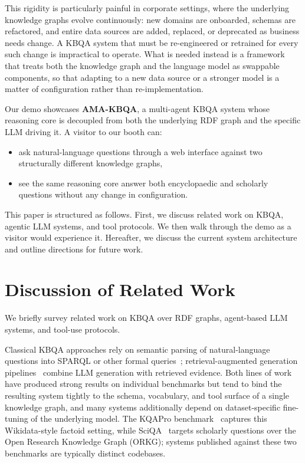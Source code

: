 \documentclass[sigconf,natbib=true]{ceurart}
\begin{document}
This rigidity is particularly painful in corporate settings, where the
underlying knowledge graphs evolve continuously: new domains are
onboarded, schemas are refactored, and entire data sources are added,
replaced, or deprecated as business needs change. A KBQA system that
must be re-engineered or retrained for every such change is
impractical to operate. What is needed instead is a framework that
treats both the knowledge graph and the language model as swappable
components, so that adapting to a new data source or a stronger model
is a matter of configuration rather than re-implementation.

Our demo showcases \textbf{AMA-KBQA}, a multi-agent KBQA system whose
reasoning core is decoupled from both the underlying RDF graph and the
specific LLM driving it. A visitor to our booth can:
\begin{itemize}
  \item ask natural-language questions through a web interface against
        two structurally different knowledge graphs,
  \item see the same reasoning core answer both encyclopaedic and
        scholarly questions without any change in configuration.
\end{itemize}

This paper is structured as follows. First, we discuss related work
on KBQA, agentic LLM systems, and tool protocols. We then walk
through the demo as a visitor would experience it. Hereafter, we
discuss the current system architecture and outline directions for
future work.

\section{Discussion of Related Work}

We briefly survey related work on KBQA over RDF graphs, agent-based
LLM systems, and tool-use protocols.

Classical KBQA approaches rely on semantic parsing of natural-language
questions into SPARQL or other formal queries~\cite{berant2013semantic};
retrieval-augmented generation pipelines~\cite{lewis2020retrieval}
combine LLM generation with retrieved evidence. Both lines of work
have produced strong results on individual benchmarks but tend to bind
the resulting system tightly to the schema, vocabulary, and tool surface
of a single knowledge graph, and many systems additionally depend on
dataset-specific fine-tuning of the underlying model. The KQAPro
benchmark~\cite{cao2022kqapro} captures this Wikidata-style factoid
setting, while SciQA~\cite{sciqa2023} targets scholarly questions over
the Open Research Knowledge Graph (ORKG); systems published against
these two benchmarks are typically distinct codebases.
\end{document}
